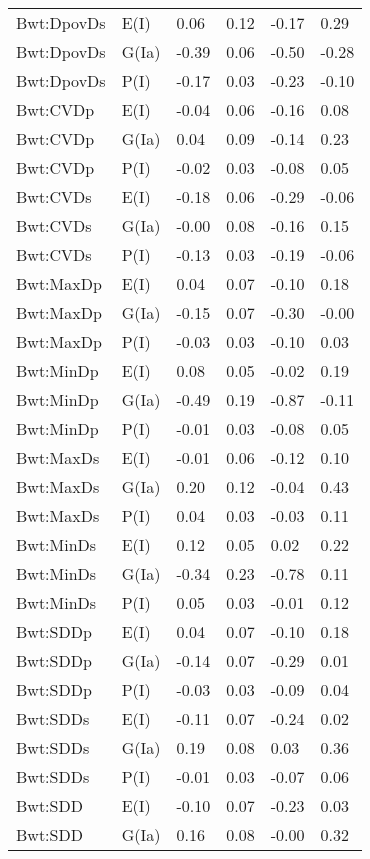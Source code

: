 \begin{center}
\begin{longtable}{|p{1.1in}|p{0.7in}|p{0.7in}|p{0.6in}|p{0.6in}|p{0.6in}|}
  Bwt:DpovDs & E(I) & 0.06 & 0.12 & -0.17 & 0.29 \\ 
  Bwt:DpovDs & G(Ia) & -0.39 & 0.06 & -0.50 & -0.28 \\ 
  Bwt:DpovDs & P(I) & -0.17 & 0.03 & -0.23 & -0.10 \\ 
  Bwt:CVDp & E(I) & -0.04 & 0.06 & -0.16 & 0.08 \\ 
  Bwt:CVDp & G(Ia) & 0.04 & 0.09 & -0.14 & 0.23 \\ 
  Bwt:CVDp & P(I) & -0.02 & 0.03 & -0.08 & 0.05 \\ 
  Bwt:CVDs & E(I) & -0.18 & 0.06 & -0.29 & -0.06 \\ 
  Bwt:CVDs & G(Ia) & -0.00 & 0.08 & -0.16 & 0.15 \\ 
  Bwt:CVDs & P(I) & -0.13 & 0.03 & -0.19 & -0.06 \\ 
  Bwt:MaxDp & E(I) & 0.04 & 0.07 & -0.10 & 0.18 \\ 
  Bwt:MaxDp & G(Ia) & -0.15 & 0.07 & -0.30 & -0.00 \\ 
  Bwt:MaxDp & P(I) & -0.03 & 0.03 & -0.10 & 0.03 \\ 
  Bwt:MinDp & E(I) & 0.08 & 0.05 & -0.02 & 0.19 \\ 
  Bwt:MinDp & G(Ia) & -0.49 & 0.19 & -0.87 & -0.11 \\ 
  Bwt:MinDp & P(I) & -0.01 & 0.03 & -0.08 & 0.05 \\ 
  Bwt:MaxDs & E(I) & -0.01 & 0.06 & -0.12 & 0.10 \\ 
  Bwt:MaxDs & G(Ia) & 0.20 & 0.12 & -0.04 & 0.43 \\ 
  Bwt:MaxDs & P(I) & 0.04 & 0.03 & -0.03 & 0.11 \\ 
  Bwt:MinDs & E(I) & 0.12 & 0.05 & 0.02 & 0.22 \\ 
  Bwt:MinDs & G(Ia) & -0.34 & 0.23 & -0.78 & 0.11 \\ 
  Bwt:MinDs & P(I) & 0.05 & 0.03 & -0.01 & 0.12 \\ 
  Bwt:SDDp & E(I) & 0.04 & 0.07 & -0.10 & 0.18 \\ 
  Bwt:SDDp & G(Ia) & -0.14 & 0.07 & -0.29 & 0.01 \\ 
  Bwt:SDDp & P(I) & -0.03 & 0.03 & -0.09 & 0.04 \\ 
  Bwt:SDDs & E(I) & -0.11 & 0.07 & -0.24 & 0.02 \\ 
  Bwt:SDDs & G(Ia) & 0.19 & 0.08 & 0.03 & 0.36 \\ 
  Bwt:SDDs & P(I) & -0.01 & 0.03 & -0.07 & 0.06 \\ 
  Bwt:SDD & E(I) & -0.10 & 0.07 & -0.23 & 0.03 \\ 
  Bwt:SDD & G(Ia) & 0.16 & 0.08 & -0.00 & 0.32 \\ 

\end{longtable}
\end{center}
